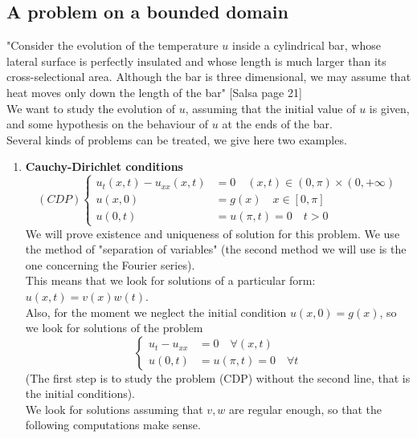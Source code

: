 \subsection{A problem on a bounded domain}
"Consider the evolution of the temperature $u$ inside a cylindrical bar, whose lateral surface is perfectly insulated and whose length is much larger than its cross-selectional area. Although the bar is three dimensional, we may assume that heat moves only down the length of the bar" [Salsa page 21]\\
We want to study the evolution of $u$, assuming that the initial value of $u$ is given, and some hypothesis on the behaviour of $u$ at the ends of the bar. \\
Several kinds of problems can be treated, we give here two examples. 
\begin{enumerate}
    \item \textbf{Cauchy-Dirichlet conditions}
    \begin{equation*}
    (CDP)
        \begin{cases}
            u_t(x,t) - u_{xx}(x,t)&= 0  \quad (x,t) \in (0,\pi) \times (0,+\infty)\\
            u(x,0) & = g(x) \quad x \in [0,\pi] \\
            u(0,t) &= u(\pi,t) = 0 \quad t > 0
        \end{cases}
    \end{equation*}
    We will prove existence and uniqueness of solution for this problem. We use the method of "separation of variables" (the second method we will use is the one concerning the Fourier series). \\
    This means that we look for solutions of a particular form: $u(x,t) = v(x) w (t)$. \\
    Also, for the moment we neglect the initial condition $u(x,0) = g(x)$, so we look for solutions of the problem
    \begin{equation*}
        \begin{cases}
            u_t - u_{xx} &= 0 \quad \forall (x,t)\\
            u(0,t) &= u(\pi,t) = 0 \quad \forall t
        \end{cases}
    \end{equation*}
    (The first step is to study the problem (CDP) without the second line, that is the initial conditions).\\
    We look for solutions assuming that $v,w$ are regular enough, so that the following computations make sense. \\

\end{enumerate}
